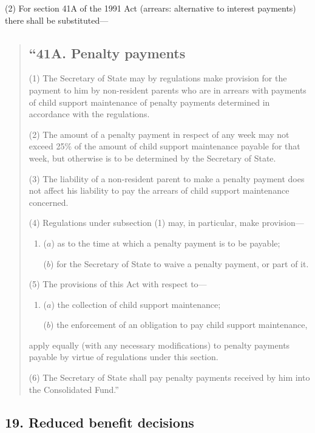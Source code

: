 \documentclass[12pt,a4paper]{article}
\begin{document}
(2) For section 41A of the 1991 Act (arrears: alternative to interest payments) there shall be substituted—
\begin{quotation}
\subsection*{“41A. Penalty payments}

(1) The Secretary of State may by regulations make provision for the payment to him by non-resident parents who are in arrears with payments of child support maintenance of penalty payments determined in accordance with the regulations.

(2) The amount of a penalty payment in respect of any week may not exceed 25\% of the amount of child support maintenance payable for that week, but otherwise is to be determined by the Secretary of State.

(3) The liability of a non-resident parent to make a penalty payment does not affect his liability to pay the arrears of child support maintenance concerned.

(4) Regulations under subsection (1)  may, in particular, make provision—
\begin{enumerate}\item[]
($a$) as to the time at which a penalty payment is to be payable;

($b$) for the Secretary of State to waive a penalty payment, or part of it.
\end{enumerate}

(5) The provisions of this Act with respect to—
\begin{enumerate}\item[]
($a$) the collection of child support maintenance;

($b$) the enforcement of an obligation to pay child support maintenance,
\end{enumerate}
apply equally (with any necessary modifications) to penalty payments payable by virtue of regulations under this section.

(6) The Secretary of State shall pay penalty payments received by him into the Consolidated Fund.”
\end{quotation}


\subsection{19. Reduced benefit decisions}
\end{document}
